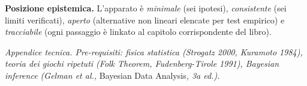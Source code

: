 \Hypoth{} \textbf{Posizione epistemica.} L'apparato è \emph{minimale}
(sei ipotesi), \emph{consistente} (sei limiti verificati), \emph{aperto}
(alternative non lineari elencate per test empirico) e
\emph{tracciabile} (ogni passaggio è linkato al capitolo corrispondente
del libro).



\emph{Appendice tecnica. Pre-requisiti: fisica statistica (Strogatz
2000, Kuramoto 1984), teoria dei giochi ripetuti (Folk Theorem,
Fudenberg-Tirole 1991), Bayesian inference (Gelman et al., }Bayesian
Data Analysis\emph{, 3a ed.).}
